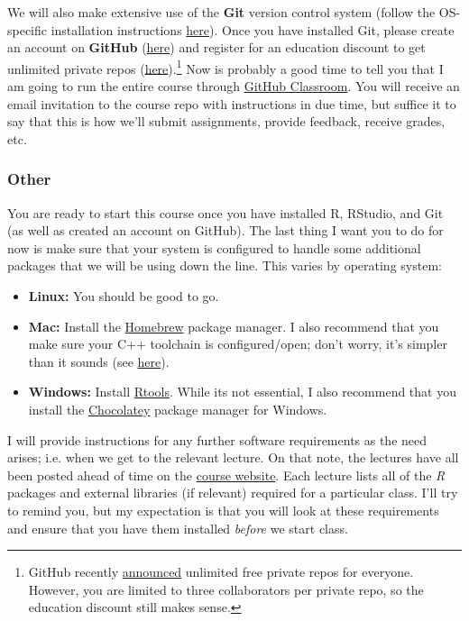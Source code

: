 \documentclass[12]{article}
\begin{document}
We will also make extensive use of the \textbf{Git} version control system (follow the OS-specific installation instructions \href{http://happygitwithr.com/install-git.html}{here}). Once you have installed Git, please create an account on \textbf{GitHub} (\href{https://github.com/join}{here}) and register for an education discount to get unlimited private repos (\href{https://education.github.com/discount_requests/new}{here}).\footnote{GitHub recently \href{https://blog.github.com/changelog/2019-01-08-pricing-changes/}{announced} unlimited free private repos for everyone. However, you are limited to three collaborators per private repo, so the education discount still makes sense.} Now is probably a good time to tell you that I am going to run the entire course through \href{https://classroom.github.com/}{GitHub Classroom}. You will receive an email invitation to the course repo with instructions in due time, but suffice it to say that this is how we'll submit assignments, provide feedback, receive grades, etc.

\vspace{-0.25cm}
\subsubsection*{Other}

You are ready to start this course once you have installed R, RStudio, and Git (as well as created an account on GitHub). The last thing I want you to do for now is make sure that your system is configured to handle some additional packages that we will be using down the line. This varies by operating system:

\begin{itemize}
	\item \textbf{Linux:} You should be good to go. 
	\item \textbf{Mac:} Install the \href{https://brew.sh/}{Homebrew} package manager. I also recommend that you make sure your C++ toolchain is configured/open; don't worry, it's simpler than it sounds (see \href{https://github.com/stan-dev/rstan/wiki/Installing-RStan-from-source-on-a-Mac#prerequisite--c-toolchain-and-configuration}{here}).
	\item \textbf{Windows:} Install \href{https://cran.r-project.org/bin/windows/Rtools/}{Rtools}. While its not essential, I also recommend that you install the \href{https://chocolatey.org/}{Chocolatey} package manager for Windows.
\end{itemize}

I will provide instructions for any further software requirements as the need arises; i.e. when we get to the relevant lecture. On that note, the lectures have all been posted ahead of time on the \href{https://github.com/uo-ec607}{course website}. Each lecture lists all of the \textit{R} packages and external libraries (if relevant) required for a particular class. I'll try to remind you, but my expectation is that you will look at these requirements and ensure that you have them installed \textit{before} we start class. 
\end{document}
